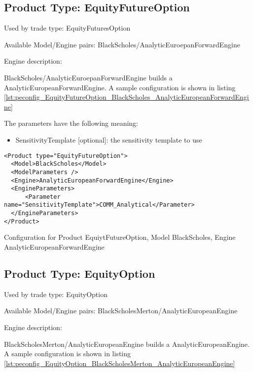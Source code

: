 \subsection{Product Type: EquityFutureOption}

Used by trade type: EquityFuturesOption

Available Model/Engine pairs: BlackScholes/AnalyticEuroepanForwardEngine

Engine description:

BlackScholes/AnalyticEuroepanForwardEngine builds a AnalyticEuropeanForwardEngine. A sample configuration is shown in
listing \ref{lst:peconfig_EquityFutureOption_BlackScholes_AnalyticEuropeanForwardEngine}

The parameters have the following meaning:

\begin{itemize}
\item SensitivityTemplate [optional]: the sensitivity template to use 
\end{itemize}

\begin{longlisting}
\begin{verbatim}
<Product type="EquityFutureOption">
  <Model>BlackScholes</Model>
  <ModelParameters />
  <Engine>AnalyticEuropeanForwardEngine</Engine>
  <EngineParameters>
      <Parameter name="SensitivityTemplate">COMM_Analytical</Parameter>
  </EngineParameters>
</Product>
\end{verbatim}
\caption{Configuration for Product EquiytFutureOption, Model BlackScholes, Engine AnalyticEuropeanForwardEngine}
\label{lst:peconfig_EquityFutureOption_BlackScholes_AnalyticEuropeanForwardEngine}
\end{longlisting}

\subsection{Product Type: EquityOption}

Used by trade type: EquityOption

Available Model/Engine pairs: BlackScholesMerton/AnalyticEuropeanEngine

Engine description:

BlackScholesMerton/AnalyticEuropeanEngine builds a AnalyticEuropeanEngine. A sample configuration is shown in listing
\ref{lst:peconfig_EquityOption_BlackScholesMerton_AnalyticEuropeanEngine}

